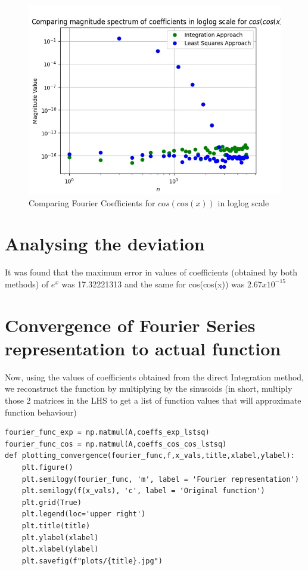 \documentclass{article}
\begin{document}
\begin{figure}[!tbh]
    \centering
    \includegraphics[scale=0.65]{plots/Comparing magnitude spectrum of coefficients in loglog scale for $cos(cos(x))$.jpg}
    \caption{Comparing Fourier Coefficients for $cos(cos(x))$ in loglog scale}
    \label{fig:Figure 10}
    \end{figure}

\hfill \break
\hfill \break

\section{Analysing the deviation}

It was found that the maximum error in values of coefficients (obtained by both methods) of $e^x$ was 17.32221313 and the same for cos(cos(x)) was $2.67 x 10^{-15}$

\section{Convergence of Fourier Series representation to actual function}

Now, using the values of coefficients obtained from the direct Integration method, we reconstruct the function by multiplying by the sinusoids (in short, multiply those 2 matrices in the LHS to get a list of function values that will approximate function behaviour)

\begin{lstlisting}
fourier_func_exp = np.matmul(A,coeffs_exp_lstsq)
fourier_func_cos = np.matmul(A,coeffs_cos_cos_lstsq)
def plotting_convergence(fourier_func,f,x_vals,title,xlabel,ylabel):            
    plt.figure()
    plt.semilogy(fourier_func, 'm', label = 'Fourier representation')
    plt.semilogy(f(x_vals), 'c', label = 'Original function')
    plt.grid(True)
    plt.legend(loc='upper right')
    plt.title(title)
    plt.ylabel(xlabel)
    plt.xlabel(ylabel)
    plt.savefig(f"plots/{title}.jpg")  

\end{lstlisting}
\end{document}
